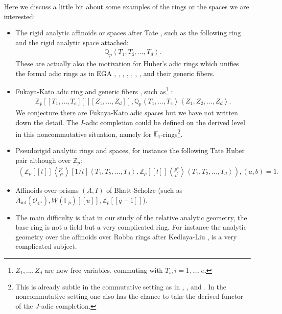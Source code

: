\documentclass[11pt]{report}
\begin{document}
\indent Here we discuss a little bit about some examples of the rings or the spaces we are interested:
\begin{itemize}
\justifying
\item<1-> The rigid analytic affinoids or spaces after Tate \cite{Ta}, such as the following ring and the rigid analytic space attached:
\begin{align}
\mathbb{Q}_p\left<T_1,T_2,...,T_d\right>.	
\end{align}
These are actually also the motivation for Huber's adic rings \cite{Hu} which unifies the formal adic rings as in EGA \cite{EGAI1}, \cite{EGAII}, \cite{EGAIII1}, \cite{EGAIII2}, \cite{EGAIV1}, \cite{EGAIV2}, \cite{EGAIV3}, \cite{EGAIV4} and their generic fibers. 
\item<2-> Fukaya-Kato adic ring and generic fibers \cite{FK}, such as\footnote{$Z_1,...,Z_d$ are now free variables, commuting with $T_i,i=1,...,e$.} :
\begin{align}
\mathbb{Z}_p[[T_1,...,T_e]][[Z_1,...,Z_d]], \mathbb{Q}_p\left<T_1,...,T_e\right>\left<Z_1,Z_2,...,Z_d\right>.	
\end{align}
We conjecture there are Fukaya-Kato adic spaces but we have not written down the detail. The $I$-adic completion could be defined on the derived level in this noncommutative situation, namely for $\mathbb{E}_1$-rings\footnote{This is already subtle in the commutative setting as in \cite{BS2}, \cite{Po}, \cite[Section 15.90]{SP} and \cite{Ye}. In the noncommutative setting one also has the chance to take the derived functor of the $J$-adic completion.}.	
\end{itemize}

 	








\begin{itemize}
\justifying
\item<3-> Pseudorigid analytic rings and spaces, for instance the following Tate Huber pair although over $\mathbb{Z}_p$:
\begin{align}
(\mathbb{Z}_p[[t]]\left<\frac{p^a}{t^b}\right>[1/t]\left<T_1,T_2,...,T_d\right>, \mathbb{Z}_p[[t]]\left<\frac{p^a}{t^b}\right>\left<T_1,T_2,...,T_d\right>), (a,b)=1.	
\end{align}

\item<4-> Affinoids over prisms $(A,I)$ of Bhatt-Scholze \cite{BS} (such as $A_\mathrm{inf}(\mathcal{O}_{\mathbb{C}^\flat}),W(\mathbb{F}_p)[[u]],\mathbb{Z}_p[[q-1]]$).  	


\item<5-> The main difficulty is that in our study of the relative analytic geometry, the base ring is not a field but a very complicated ring. For instance the analytic geometry over the affinoids over Robba rings after Kedlaya-Liu \cite{KL1}, \cite{KL2} is a very complicated subject.  	
\end{itemize}
\end{document}
